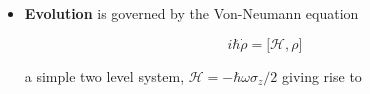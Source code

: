 \begin{itemize}
 	\begin{equation}\label{expectation}
 		\begin{aligned}
	 		\iaverage{\sigma_z} &= \itrace{\begin{pmatrix}
	 			\rho_{00}&\rho_{01}\\\rho_{10}&\rho_{11}
	 			\end{pmatrix}\begin{pmatrix}
	 			1&0\\0&-1
	 			\end{pmatrix}} = \itrace{\begin{pmatrix}
	 				\rho_{00}&-\rho_{01}\\\rho_{10}&-\rho_{11}
	 			\end{pmatrix}} = \rho_{00}-\rho_{11}; \\
 			&\red{\rho_{11} = \frac{1-\iaverage{\sigma_z}}{2}};\quad \quad \red{\rho_{00} = \frac{1+\iaverage{\sigma_z}}{2}}\\
				\iaverage{\sigma_x} &=  \rho_{01}+\rho_{10}\\
				\iaverage{\sigma_y} &=  i\rho_{01}-i\rho_{10}\\
				\iaverage{\sigma_{+}} &= \frac{\iaverage{\sigma_x}+i\iaverage{\sigma_y}}{2} = \rho_{10}\\
				\iaverage{\sigma_{-}}& = \frac{\iaverage{\sigma_x}-i\iaverage{\sigma_y}}{2} = \rho_{01}\\
 		\end{aligned}
 	\end{equation}
 	
 	\item \textbf{Evolution} is governed by the Von-Neumann equation
 	
 	\begin{equation}\label{vonN}
 		i\hbar\dot{\rho} = \bigg[\mathcal{H},\rho\bigg]
 	\end{equation} 
 	
 	\noindent a simple two level system, $ \mathcal{H} = -\hbar\omega\sigma_z/2 $ giving rise to 
 	

\end{itemize}
